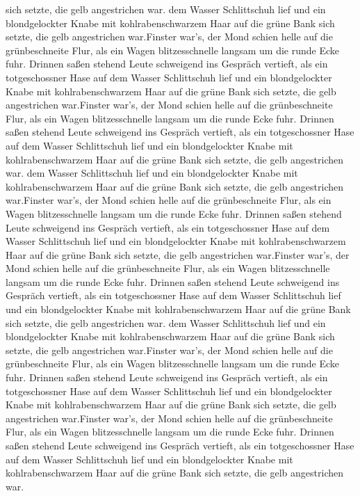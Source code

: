 \documentclass[12pt]{g-brief}
\begin{document}
\begin{g-brief}
sich setzte, die gelb angestrichen war. dem Wasser Schlittschuh lief und ein
blondgelockter Knabe mit kohlrabenschwarzem Haar auf die grüne Bank
sich setzte, die gelb angestrichen war.Finster war's, der Mond schien helle auf die grünbeschneite Flur, als
ein Wagen blitzesschnelle langsam um die runde Ecke fuhr. Drinnen
saßen stehend Leute schweigend ins Gespräch vertieft, als ein
totgeschossner Hase auf dem Wasser Schlittschuh lief und ein
blondgelockter Knabe mit kohlrabenschwarzem Haar auf die grüne Bank
sich setzte, die gelb angestrichen war.Finster war's, der Mond schien helle auf die grünbeschneite Flur, als
ein Wagen blitzesschnelle langsam um die runde Ecke fuhr. Drinnen
saßen stehend Leute schweigend ins Gespräch vertieft, als ein
totgeschossner Hase auf dem Wasser Schlittschuh lief und ein
blondgelockter Knabe mit kohlrabenschwarzem Haar auf die grüne Bank
sich setzte, die gelb angestrichen war. dem Wasser Schlittschuh lief und ein
blondgelockter Knabe mit kohlrabenschwarzem Haar auf die grüne Bank
sich setzte, die gelb angestrichen war.Finster war's, der Mond schien helle auf die grünbeschneite Flur, als
ein Wagen blitzesschnelle langsam um die runde Ecke fuhr. Drinnen
saßen stehend Leute schweigend ins Gespräch vertieft, als ein
totgeschossner Hase auf dem Wasser Schlittschuh lief und ein
blondgelockter Knabe mit kohlrabenschwarzem Haar auf die grüne Bank
sich setzte, die gelb angestrichen war.Finster war's, der Mond schien helle auf die grünbeschneite Flur, als
ein Wagen blitzesschnelle langsam um die runde Ecke fuhr. Drinnen
saßen stehend Leute schweigend ins Gespräch vertieft, als ein
totgeschossner Hase auf dem Wasser Schlittschuh lief und ein
blondgelockter Knabe mit kohlrabenschwarzem Haar auf die grüne Bank
sich setzte, die gelb angestrichen war. dem Wasser Schlittschuh lief und ein
blondgelockter Knabe mit kohlrabenschwarzem Haar auf die grüne Bank
sich setzte, die gelb angestrichen war.Finster war's, der Mond schien helle auf die grünbeschneite Flur, als
ein Wagen blitzesschnelle langsam um die runde Ecke fuhr. Drinnen
saßen stehend Leute schweigend ins Gespräch vertieft, als ein
totgeschossner Hase auf dem Wasser Schlittschuh lief und ein
blondgelockter Knabe mit kohlrabenschwarzem Haar auf die grüne Bank
sich setzte, die gelb angestrichen war.Finster war's, der Mond schien helle auf die grünbeschneite Flur, als
ein Wagen blitzesschnelle langsam um die runde Ecke fuhr. Drinnen
saßen stehend Leute schweigend ins Gespräch vertieft, als ein
totgeschossner Hase auf dem Wasser Schlittschuh lief und ein
blondgelockter Knabe mit kohlrabenschwarzem Haar auf die grüne Bank
sich setzte, die gelb angestrichen war.

 \end{g-brief}
\end{document}
